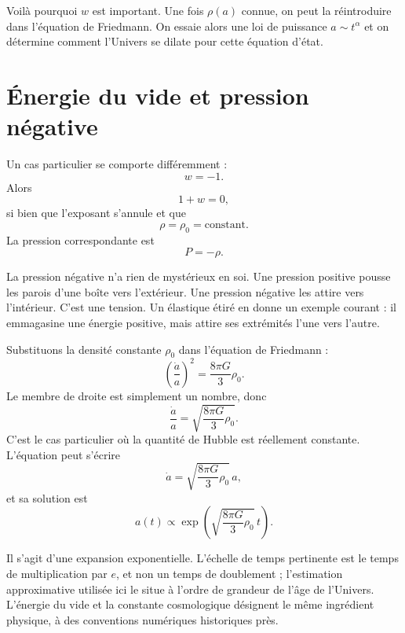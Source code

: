 Voilà pourquoi \(w\) est important. Une fois \(\rho(a)\) connue, on peut la réintroduire dans l’équation de Friedmann. On essaie alors une loi de puissance \(a\sim t^\alpha\) et on détermine comment l’Univers se dilate pour cette équation d’état.

\section{Énergie du vide et pression négative}

Un cas particulier se comporte différemment :
\begin{equation}
w=-1.
\end{equation}
Alors
\begin{equation}
1+w=0,
\end{equation}
si bien que l’exposant s’annule et que
\begin{equation}
\rho=\rho_0=\text{constant}.
\end{equation}
La pression correspondante est
\begin{equation}
P=-\rho .
\end{equation}

La pression négative n’a rien de mystérieux en soi. Une pression positive pousse les parois d’une boîte vers l’extérieur. Une pression négative les attire vers l’intérieur. C’est une tension. Un élastique étiré en donne un exemple courant : il emmagasine une énergie positive, mais attire ses extrémités l’une vers l’autre.

Substituons la densité constante \(\rho_0\) dans l’équation de Friedmann :
\begin{equation}
\left(\frac{\dot a}{a}\right)^2=\frac{8\pi G}{3}\rho_0.
\end{equation}
Le membre de droite est simplement un nombre, donc
\begin{equation}
\frac{\dot a}{a}=\sqrt{\frac{8\pi G}{3}\rho_0}.
\end{equation}
C’est le cas particulier où la quantité de Hubble est réellement constante. L’équation peut s’écrire
\begin{equation}
\dot a=\sqrt{\frac{8\pi G}{3}\rho_0}\,a,
\end{equation}
et sa solution est
\begin{equation}
a(t)\propto \exp\!\left(\sqrt{\frac{8\pi G}{3}\rho_0}\,t\right).
\end{equation}

Il s’agit d’une expansion exponentielle. L’échelle de temps pertinente est le temps de multiplication par \(e\), et non un temps de doublement ; l’estimation approximative utilisée ici le situe à l’ordre de grandeur de l’âge de l’Univers. L’énergie du vide et la constante cosmologique désignent le même ingrédient physique, à des conventions numériques historiques près.

